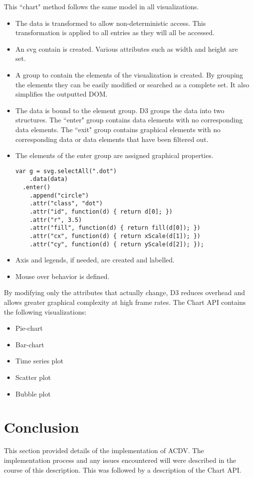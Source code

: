 \documentclass[a4paper, 11pt, titlepage, onehalfspacing]{report}
\begin{document}
This ``chart" method follows the same model in all visualizations. 
\begin{itemize}
\item The data is transformed to allow non-deterministic access. This transformation is applied to all entries as they will all be accessed.
\item An svg contain is created. Various attributes such as width and height are set.
\item A group to contain the elements of the visualization is created. By grouping the elements they can be easily modified or searched as a complete set. It also simplifies the outputted DOM.
\item The data is bound to the element group. D3 groups the data into two structures. The ``enter" group contains data elements with no corresponding data elements. The ``exit" group contains graphical elements with no corresponding data or data elements that have been filtered out.
\item The elements of the enter group are assigned graphical properties.
\begin{verbatim}
var g = svg.selectAll(".dot")
    .data(data)
  .enter()
    .append("circle")
    .attr("class", "dot")
    .attr("id", function(d) { return d[0]; })
    .attr("r", 3.5)
    .attr("fill", function(d) { return fill(d[0]); })
    .attr("cx", function(d) { return xScale(d[1]); })
    .attr("cy", function(d) { return yScale(d[2]); });
\end{verbatim}
\item Axis and legends, if needed, are created and labelled.
\item Mouse over behavior is defined.
\end{itemize} 

By modifying only the attributes that actually change, D3 reduces overhead and allows greater graphical complexity at high frame rates. The Chart API contains the following visualizations:
\begin{itemize}
\item Pie-chart
\item Bar-chart
\item Time series plot
\item Scatter plot
\item Bubble plot
\end{itemize}
\section{Conclusion}
This section provided details of the implementation of AC\lightning{}DV. The implementation process and any issues encountered will were described in the course of this description. This was followed by a description of the Chart API.
\end{document}
